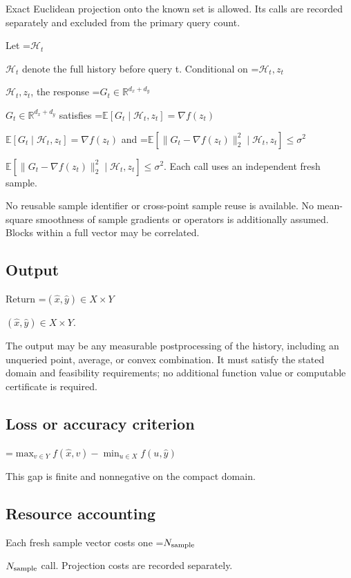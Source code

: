 \documentclass[10pt,a4paper]{article}
\newcommand{\AtlasMath}[1]{\par\begingroup\centering\setbox0=\hbox{$\displaystyle #1$}\ifdim\wd0>1.4\linewidth\typeout{ATLAS WIDE FORMULA: \the\wd0}\fi\ifdim\wd0>\linewidth\resizebox{\linewidth}{!}{\box0}\else\box0\fi\par\endgroup}
\newcommand{\AtlasInlineMath}[1]{\begingroup\setbox0=\hbox{$#1$}\ifdim\wd0>.4\linewidth\endgroup\AtlasMath{#1}\else\endgroup$#1$\fi}
\begin{document}
Exact Euclidean projection onto the known set is allowed. Its calls are recorded separately and excluded from the primary query count.



Let \AtlasInlineMath{\mathcal H_t} denote the full history before query t. Conditional on \AtlasInlineMath{\mathcal H_t,z_t}, the response \AtlasInlineMath{G_t\in\mathbb R^{d_x+d_y}} satisfies \AtlasInlineMath{\mathbb E[G_t\mid\mathcal H_t,z_t]=\nabla f(z_t)} and \AtlasInlineMath{\mathbb E[\|G_t-\nabla f(z_t)\|_2^2\mid\mathcal H_t,z_t]\le\sigma^2}. Each call uses an independent fresh sample.



No reusable sample identifier or cross-point sample reuse is available. No mean-square smoothness of sample gradients or operators is additionally assumed. Blocks within a full vector may be correlated.



\subsection{Output}


Return \AtlasInlineMath{(\widehat{x},\widehat{y})\in X\times Y}.



The output may be any measurable postprocessing of the history, including an unqueried point, average, or convex combination. It must satisfy the stated domain and feasibility requirements; no additional function value or computable certificate is required.



\subsection{Loss or accuracy criterion}



\AtlasMath{\max_{v\in Y}f(\widehat{x},v)-\min_{u\in X}f(u,\widehat{y})}




This gap is finite and nonnegative on the compact domain.



\subsection{Resource accounting}


Each fresh sample vector costs one \AtlasInlineMath{N_{\rm sample}} call. Projection costs are recorded separately.
\end{document}
